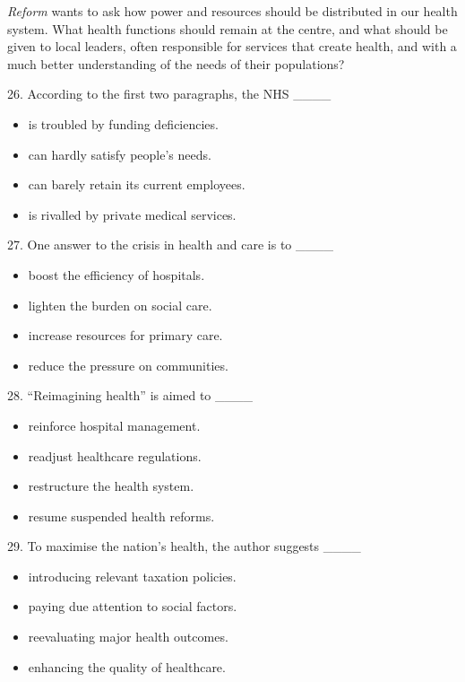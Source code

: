 \documentclass[UTF8,11pt]{ctexart}
\begin{document}
\textit{Reform} wants to ask how power and resources should be distributed in our health system. What health functions should remain at the centre, and what should be given to local leaders, often responsible for services that create health, and with a much better understanding of the needs of their populations?


26. According to the first two paragraphs, the NHS \_\_\_\_


\begin{itemize}[leftmargin=2em,itemsep=.2em,topsep=.4em]\item[A.] is troubled by funding deficiencies.
\item[B.] can hardly satisfy people’s needs.
\item[C.] can barely retain its current employees.
\item[D.] is rivalled by private medical services.
\end{itemize}

27. One answer to the crisis in health and care is to \_\_\_\_


\begin{itemize}[leftmargin=2em,itemsep=.2em,topsep=.4em]\item[A.] boost the efficiency of hospitals.
\item[B.] lighten the burden on social care.
\item[C.] increase resources for primary care.
\item[D.] reduce the pressure on communities.
\end{itemize}

28. “Reimagining health” is aimed to \_\_\_\_


\begin{itemize}[leftmargin=2em,itemsep=.2em,topsep=.4em]\item[A.] reinforce hospital management.
\item[B.] readjust healthcare regulations.
\item[C.] restructure the health system.
\item[D.] resume suspended health reforms.
\end{itemize}

29. To maximise the nation’s health, the author suggests \_\_\_\_


\begin{itemize}[leftmargin=2em,itemsep=.2em,topsep=.4em]\item[A.] introducing relevant taxation policies.
\item[B.] paying due attention to social factors.
\item[C.] reevaluating major health outcomes.
\item[D.] enhancing the quality of healthcare.
\end{itemize}
\end{document}
